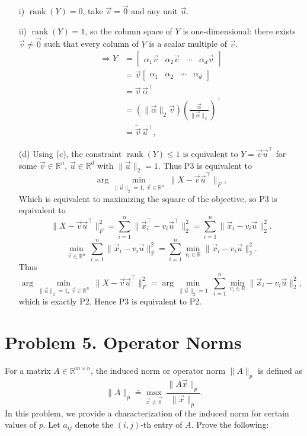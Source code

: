 \documentclass[
  12pt,
]{fphw}
\begin{document}
\begin{enumerate}
i) $\operatorname{rank}(Y)=0$, take $\vec v=\vec 0$ and any unit $\vec u$.

ii) $\operatorname{rank}(Y)=1$, so the column space of $Y$ is one-dimensional:
there exists $\vec v\neq \vec 0$ such that every column of $Y$ is a scalar multiple of $\vec v$.
\begin{align*}
\Longrightarrow Y 
& = \begin{bmatrix} \alpha_1 \vec v & \alpha_2 \vec v & \cdots & \alpha_d \vec v \end{bmatrix} \\
& = \vec v \begin{bmatrix} \alpha_1 & \alpha_2 & \cdots & \alpha_d \end{bmatrix} \\
& = \vec v\,\vec \alpha^\top \\
& = (\|\vec \alpha\|_2\vec v)\left(\frac{\vec \alpha}{\|\vec \alpha\|_2}\right)^\top \\
& = \tilde{\vec v}\,\vec u^\top,
\end{align*}

\item[(d)] Using (c), the constraint $\operatorname{rank}(Y)\le 1$ is equivalent to $Y=\vec v\vec u^\top$ for some
$\vec v\in\mathbb{R}^n$, $\vec u\in\mathbb{R}^d$ with $\|\vec u\|_2=1$. Thus P3 is equivalent to
\[
\arg\min_{\|\vec u\|_2=1,\ \vec v\in\mathbb{R}^n}\ \|X-\vec v\vec u^\top\|_F,
\]
Which is equivalent to maximizing the square of the objective, so P3 is equivalent to
\[
\|X-\vec v\vec u^\top\|_F^2
= \sum_{i=1}^n \|\vec x_i^\top - v_i \vec u^\top\|_2^2
= \sum_{i=1}^n \|\vec x_i - v_i \vec u\|_2^2.
\]
\[
\min_{\vec v\in\mathbb{R}^n}\ \sum_{i=1}^n \|\vec x_i - v_i \vec u\|_2^2
= \sum_{i=1}^n \min_{v_i\in\mathbb{R}} \|\vec x_i - v_i \vec u\|_2^2.
\]
Thus
\[
\arg\min_{\|\vec u\|_2=1,\ \vec v\in\mathbb{R}^n}\ \|X-\vec v\vec u^\top\|_F^2
=
\arg\min_{\|\vec u\|_2=1}\ \sum_{i=1}^n \min_{v_i\in\mathbb{R}} \|\vec x_i - v_i \vec u\|_2^2,
\]
which is exactly P2. Hence P3 is equivalent to P2.
\end{enumerate}



\newpage
\section*{Problem 5. Operator Norms}
For a matrix $A \in \mathbb{R}^{m\times n}$, the induced norm or operator norm $\|A\|_p$
is defined as
\[
\|A\|_p \doteq \max_{\vec x\ne \vec 0}\ \frac{\|A\vec x\|_p}{\|\vec x\|_p}. \tag{17}
\]
In this problem, we provide a characterization of the induced norm for certain values of $p$.
Let $a_{ij}$ denote the $(i, j)$-th entry of $A$. Prove the following:
\end{document}
